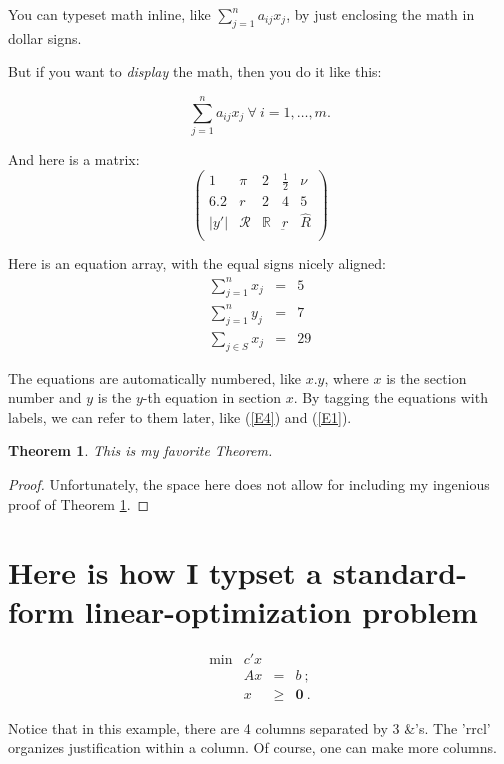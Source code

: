 \documentclass{amsart}
\newtheorem{thm}{Theorem}[section]
\theoremstyle{definition}
\theoremstyle{remark}
\numberwithin{equation}{section}
\begin{document}
You can typeset math inline, like $\sum_{j=1}^n a_{ij} x_j$, by just enclosing the math in dollar signs.

But if you want to \emph{display} the math, then you do it like this:

\[
\sum_{j=1}^n a_{ij} x_j~ \forall~ i=1,\ldots,m.
\]

And here is a matrix:
\[
\left(
  \begin{array}{ccccc}
    1 & \pi & 2& \frac{1}{2} & \nu \\
    6.2 & r & 2 & 4 & 5 \\
    |y'| & \mathcal{R} & \mathbb{R} & \underbar{r} & \hat{R} \\
  \end{array}
\right)
\]

Here is an equation array, with the equal signs nicely aligned:
\begin{eqnarray}
  \sum_{j=1}^n x_j &=& 5 \label{E1} \\
    \sum_{j=1}^n y_j &=& 7 \label{E7} \\
  \sum_{j\in S} x_j &=& 29 \label{E4}
\end{eqnarray}

The equations are automatically numbered, like $x.y$, where
$x$ is the section number and $y$ is the $y$-th equation in section $x$.
By tagging the equations
with labels, we can refer to them later, like (\ref{E4}) and (\ref{E1}).

\begin{thm}\label{Favorite}
This is my favorite Theorem.
\end{thm}
\begin{proof}
Unfortunately, the space here does not allow for including my ingenious proof
of Theorem \ref{Favorite}.
\end{proof}

\section{Here is how I typset a standard-form linear-optimization problem}

\[
\tag{P}
\begin{array}{rrcl}
 \min & c'x  &      &   \\
      &  Ax  &   =  & b~; \\
      &   x  & \geq & \mathbf{0}~.
\end{array}
\]

Notice that in this example, there are 4 columns separated by 3 \&'s.
The 'rrcl' organizes justification within a column.
Of course, one can make more columns.
\end{document}
